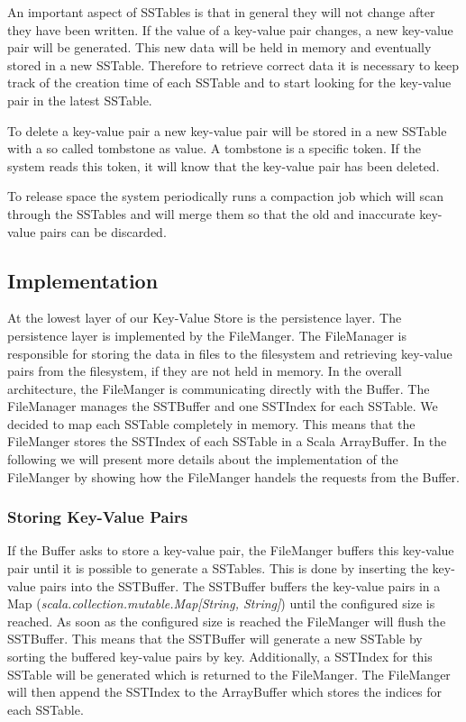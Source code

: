\documentclass[a4paper, twocolumn,11pt]{article}
\begin{document}
An important aspect of SSTables is that in general they will not change after they have been written. If the value of a key-value pair changes, a new key-value pair will be generated. This new data will be held in memory and eventually stored in a new SSTable. Therefore to retrieve correct data it is necessary to keep track of the creation time of each SSTable and to start looking for the key-value pair in the latest SSTable. 

To delete a key-value pair a new key-value pair will be stored in a new SSTable with a so called tombstone as value. A tombstone is a specific token. If the system reads this token, it will know that the key-value pair has been deleted. 

To release space the system periodically runs a compaction job which will scan through the SSTables and will merge them so that the old and inaccurate key-value pairs can be discarded. 

\subsection{Implementation}
At the lowest layer of our Key-Value Store is the persistence layer. The persistence layer is implemented by the FileManger. The FileManager is responsible for storing the data in files to the filesystem and retrieving key-value pairs from the filesystem, if they are not held in memory. In the overall architecture, the FileManger is communicating directly with the Buffer. The FileManager manages the SSTBuffer and one SSTIndex for each SSTable. We decided to map each SSTable completely in memory. This means that the FileManger stores the SSTIndex of each SSTable in a Scala ArrayBuffer. In the following we will present more details about the implementation of the FileManger by showing how the FileManger handels the requests from the Buffer.  

\subsubsection{Storing Key-Value Pairs}
If the Buffer asks to store a key-value pair, the FileManger buffers this key-value pair until it is possible to generate a SSTables. This is done by inserting the key-value pairs into the SSTBuffer. The SSTBuffer buffers the key-value pairs in a Map (\textit{scala.collection.mutable.Map[String, String]}) until the configured size is reached. As soon as the configured size is reached the FileManger will flush the SSTBuffer. This means that the SSTBuffer will generate a new SSTable by sorting the buffered key-value pairs by key. Additionally, a SSTIndex for this SSTable will be generated which is returned to the FileManger. The FileManger will then append the SSTIndex to the ArrayBuffer which stores the indices for each SSTable. 
\end{document}

